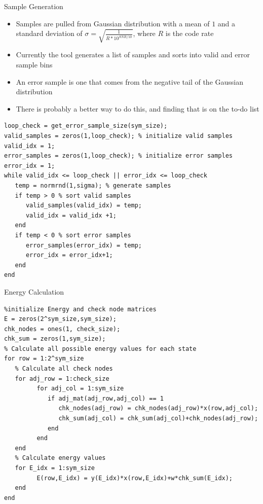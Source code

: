 \documentclass[10pt,ignorenonframetext,]{beamer}
\providecommand{\tightlist}{%
  \setlength{\itemsep}{0pt}\setlength{\parskip}{0pt}}
\begin{document}
\begin{frame}[fragile]{Sample Generation}
\protect\hypertarget{sample-generation}{}
\begin{itemize}[<+->]
\tightlist
\item
  Samples are pulled from Gaussian distribution with a mean of \(1\) and
  a standard deviation of \(\sigma=\sqrt{\frac{1}{R*10^{SNR/10}}}\),
  where \(R\) is the code rate
\item
  Currently the tool generates a list of samples and sorts into valid
  and error sample bins
\item
  An error sample is one that comes from the negative tail of the
  Gaussian distribution
\item
  There is probably a better way to do this, and finding that is on the
  to-do list
\end{itemize}

\begin{verbatim}
loop_check = get_error_sample_size(sym_size);
valid_samples = zeros(1,loop_check); % initialize valid samples
valid_idx = 1;
error_samples = zeros(1,loop_check); % initialize error samples
error_idx = 1;
while valid_idx <= loop_check || error_idx <= loop_check 
   temp = normrnd(1,sigma); % generate samples
   if temp > 0 % sort valid samples
      valid_samples(valid_idx) = temp;
      valid_idx = valid_idx +1;
   end
   if temp < 0 % sort error samples
      error_samples(error_idx) = temp;
      error_idx = error_idx+1;
   end
end
\end{verbatim}
\end{frame}

\begin{frame}[fragile]{Energy Calculation}
\protect\hypertarget{energy-calculation}{}
\begin{verbatim}
%initialize Energy and check node matrices
E = zeros(2^sym_size,sym_size);
chk_nodes = ones(1, check_size);
chk_sum = zeros(1,sym_size);
% Calculate all possible energy values for each state
for row = 1:2^sym_size
   % Calculate all check nodes
   for adj_row = 1:check_size
         for adj_col = 1:sym_size
            if adj_mat(adj_row,adj_col) == 1
               chk_nodes(adj_row) = chk_nodes(adj_row)*x(row,adj_col);
               chk_sum(adj_col) = chk_sum(adj_col)+chk_nodes(adj_row);
            end
         end
   end
   % Calculate energy values
   for E_idx = 1:sym_size
         E(row,E_idx) = y(E_idx)*x(row,E_idx)+w*chk_sum(E_idx);
   end
end
\end{verbatim}
\end{frame}
\end{document}
